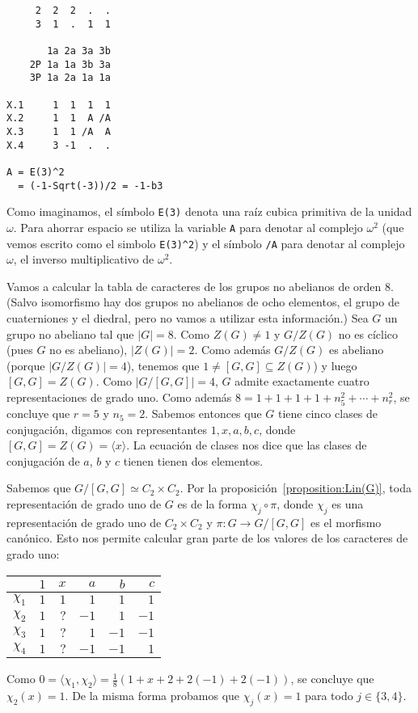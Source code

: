 \begin{example}
\begin{lstlisting}
     2  2  2  .  .
     3  1  .  1  1

       1a 2a 3a 3b
    2P 1a 1a 3b 3a
    3P 1a 2a 1a 1a

X.1     1  1  1  1
X.2     1  1  A /A
X.3     1  1 /A  A
X.4     3 -1  .  .

A = E(3)^2
  = (-1-Sqrt(-3))/2 = -1-b3
\end{lstlisting}
Como imaginamos, el símbolo \lstinline{E(3)} denota una raíz cubica primitiva de la unidad $\omega$. 
Para ahorrar espacio se utiliza la variable \lstinline{A} para denotar al complejo $\omega^2$ (que vemos escrito como el simbolo \lstinline{E(3)^2}) y
el símbolo \lstinline{/A} para denotar al complejo $\omega$, el inverso multiplicativo de $\omega^2$. 
\end{example}

\begin{example}
	Vamos a calcular la tabla de caracteres de los grupos no abelianos de orden
	$8$. (Salvo isomorfismo hay dos grupos no abelianos de ocho elementos, el
	grupo de cuaterniones y el diedral, pero no vamos a utilizar esta
	información.) Sea $G$ un grupo no abeliano tal que $|G|=8$. Como $Z(G)\ne
	1$ y $G/Z(G)$ no es cíclico (pues $G$ no es abeliano), $|Z(G)|=2$. Como
	además $G/Z(G)$ es abeliano (porque $|G/Z(G)|=4$), tenemos que $1\ne
	[G,G]\subseteq Z(G)$) y luego $[G,G]=Z(G)$. Como $|G/[G,G]|=4$, $G$ admite
	exactamente cuatro representaciones de grado uno. Como además
	$8=1+1+1+1+n_5^2+\cdots+n_r^2$, se concluye que $r=5$ y $n_5=2$.  Sabemos
	entonces que $G$ tiene cinco clases de conjugación, digamos con
	representantes $1,x,a,b,c$, donde $[G,G]=Z(G)=\langle x\rangle$.  La
	ecuación de clases nos dice que las clases de conjugación de $a$, $b$ y $c$
	tienen tienen dos elementos. 

	Sabemos que $G/[G,G]\simeq C_2\times C_2$. Por la
	proposición~\ref{proposition:Lin(G)}, toda representación de grado uno de
	$G$ es de la forma $\chi_j\circ\pi$, donde $\chi_j$ es una representación
	de grado uno de $C_2\times C_2$ y $\pi\colon G\to G/[G,G]$ es el morfismo
	canónico. Esto nos permite calcular gran parte de los valores de los
	caracteres de grado uno:
	\begin{center}
		\begin{tabular}{|c|rrrrr|}
			\hline
			& $1$ & $x$ & $a$ & $b$ & $c$\tabularnewline
			\hline
			$\chi_1$ & $1$ & $1$ & $1$ & $1$ & $1$\tabularnewline
			$\chi_2$ & $1$ & $?$ & $-1$ & $1$ & $-1$\tabularnewline
			$\chi_3$ & $1$ & $?$ & $1$ & $-1$ & $-1$\tabularnewline
			$\chi_4$ & $1$ & $?$ & $-1$ & $-1$ & $1$\tabularnewline
			\hline
		\end{tabular}
	\end{center}
	Como $0=\langle \chi_1,\chi_2\rangle=\frac18(1+x+2+2(-1)+2(-1))$, se
	concluye que $\chi_2(x)=1$. De la misma forma probamos que $\chi_j(x)=1$
	para todo $j\in\{3,4\}$. 
	

\end{example}
